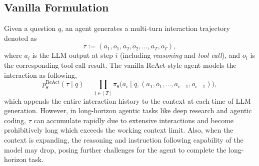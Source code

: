 \subsection{Vanilla Formulation}
Given a question $q$, an agent generates a multi-turn interaction trajectory denoted as
\begin{equation}
    \tau := (a_1, o_1, a_2, o_2, \ldots, a_T, o_T),
\end{equation}
where $a_i$ is the LLM output at step $i$ (including \textit{reasoning} and \textit{tool call}), and $o_i$ is the corresponding tool-call result.
The vanilla ReAct-style agent \citep{Yao2022ReAct} models the interaction as following,
\begin{equation}
   p^{\mathrm{ReAct}}_{\theta}(\tau \mid q) = \prod_{i\in[T]} \pi_{\theta}\big(a_i \mid q, (a_1,o_1,\ldots, a_{i-1}, o_{i-1})\big),
\end{equation}
which appends the entire interaction history to the context at each time of LLM generation. 
However, in long-horizon agentic tasks like deep research and agentic coding, $\tau$ can accumulate rapidly due to extensive interactions and become prohibitively long which exceeds the working context limit.
Also, when the context is expanding, the reasoning and instruction following capability of the model may drop, posing further challenges for the agent to complete the long-horizon task.



